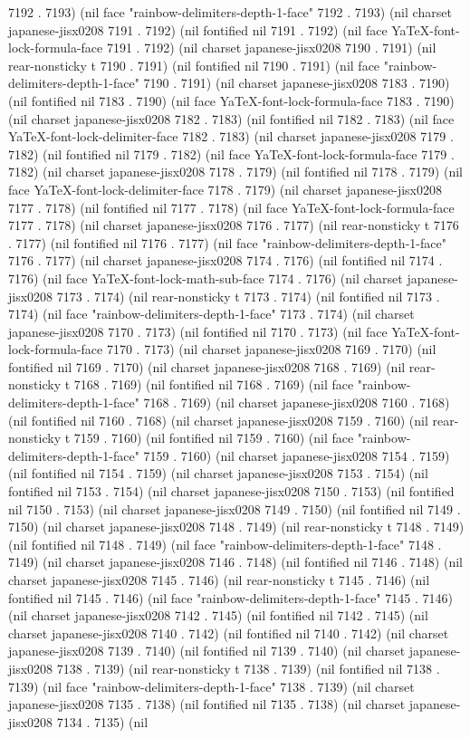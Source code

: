 7192 . 7193) (nil face "rainbow-delimiters-depth-1-face" 7192 . 7193) (nil charset japanese-jisx0208 7191 . 7192) (nil fontified nil 7191 . 7192) (nil face YaTeX-font-lock-formula-face 7191 . 7192) (nil charset japanese-jisx0208 7190 . 7191) (nil rear-nonsticky t 7190 . 7191) (nil fontified nil 7190 . 7191) (nil face "rainbow-delimiters-depth-1-face" 7190 . 7191) (nil charset japanese-jisx0208 7183 . 7190) (nil fontified nil 7183 . 7190) (nil face YaTeX-font-lock-formula-face 7183 . 7190) (nil charset japanese-jisx0208 7182 . 7183) (nil fontified nil 7182 . 7183) (nil face YaTeX-font-lock-delimiter-face 7182 . 7183) (nil charset japanese-jisx0208 7179 . 7182) (nil fontified nil 7179 . 7182) (nil face YaTeX-font-lock-formula-face 7179 . 7182) (nil charset japanese-jisx0208 7178 . 7179) (nil fontified nil 7178 . 7179) (nil face YaTeX-font-lock-delimiter-face 7178 . 7179) (nil charset japanese-jisx0208 7177 . 7178) (nil fontified nil 7177 . 7178) (nil face YaTeX-font-lock-formula-face 7177 . 7178) (nil charset japanese-jisx0208 7176 . 7177) (nil rear-nonsticky t 7176 . 7177) (nil fontified nil 7176 . 7177) (nil face "rainbow-delimiters-depth-1-face" 7176 . 7177) (nil charset japanese-jisx0208 7174 . 7176) (nil fontified nil 7174 . 7176) (nil face YaTeX-font-lock-math-sub-face 7174 . 7176) (nil charset japanese-jisx0208 7173 . 7174) (nil rear-nonsticky t 7173 . 7174) (nil fontified nil 7173 . 7174) (nil face "rainbow-delimiters-depth-1-face" 7173 . 7174) (nil charset japanese-jisx0208 7170 . 7173) (nil fontified nil 7170 . 7173) (nil face YaTeX-font-lock-formula-face 7170 . 7173) (nil charset japanese-jisx0208 7169 . 7170) (nil fontified nil 7169 . 7170) (nil charset japanese-jisx0208 7168 . 7169) (nil rear-nonsticky t 7168 . 7169) (nil fontified nil 7168 . 7169) (nil face "rainbow-delimiters-depth-1-face" 7168 . 7169) (nil charset japanese-jisx0208 7160 . 7168) (nil fontified nil 7160 . 7168) (nil charset japanese-jisx0208 7159 . 7160) (nil rear-nonsticky t 7159 . 7160) (nil fontified nil 7159 . 7160) (nil face "rainbow-delimiters-depth-1-face" 7159 . 7160) (nil charset japanese-jisx0208 7154 . 7159) (nil fontified nil 7154 . 7159) (nil charset japanese-jisx0208 7153 . 7154) (nil fontified nil 7153 . 7154) (nil charset japanese-jisx0208 7150 . 7153) (nil fontified nil 7150 . 7153) (nil charset japanese-jisx0208 7149 . 7150) (nil fontified nil 7149 . 7150) (nil charset japanese-jisx0208 7148 . 7149) (nil rear-nonsticky t 7148 . 7149) (nil fontified nil 7148 . 7149) (nil face "rainbow-delimiters-depth-1-face" 7148 . 7149) (nil charset japanese-jisx0208 7146 . 7148) (nil fontified nil 7146 . 7148) (nil charset japanese-jisx0208 7145 . 7146) (nil rear-nonsticky t 7145 . 7146) (nil fontified nil 7145 . 7146) (nil face "rainbow-delimiters-depth-1-face" 7145 . 7146) (nil charset japanese-jisx0208 7142 . 7145) (nil fontified nil 7142 . 7145) (nil charset japanese-jisx0208 7140 . 7142) (nil fontified nil 7140 . 7142) (nil charset japanese-jisx0208 7139 . 7140) (nil fontified nil 7139 . 7140) (nil charset japanese-jisx0208 7138 . 7139) (nil rear-nonsticky t 7138 . 7139) (nil fontified nil 7138 . 7139) (nil face "rainbow-delimiters-depth-1-face" 7138 . 7139) (nil charset japanese-jisx0208 7135 . 7138) (nil fontified nil 7135 . 7138) (nil charset japanese-jisx0208 7134 . 7135) (nil 